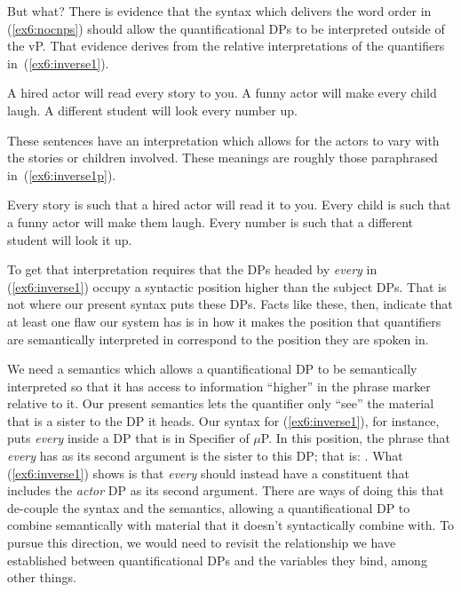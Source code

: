 But what? There is evidence that the syntax which delivers the word order in (\ref{ex6:nocnps}) should allow the quantificational DPs to be interpreted outside of the vP. That evidence derives from the relative interpretations of the quantifiers in~(\ref{ex6:inverse1}).
\begin{exe}
\raggedright
	\ex \label{ex6:inverse1}
	\begin{xlist}
		\ex A hired actor will read every story to you.
		\ex A funny actor will make every child laugh.
		\ex A different student will look every number up.
	\end{xlist}
\end{exe}
These sentences have an interpretation which allows for the actors to vary with the stories or children involved. These meanings are roughly those paraphrased in~(\ref{ex6:inverse1p}).
\begin{exe}
\raggedright
	\ex \label{ex6:inverse1p}
	\begin{xlist}
		\ex Every story is such that a hired actor will read it to you.
		\ex Every child is such that a funny actor will make them laugh.
		\ex Every number is such that a different student will look it up.
	\end{xlist}
\end{exe}
To get that interpretation requires that the DPs headed by \emph{every} in (\ref{ex6:inverse1}) occupy a syntactic position higher than the subject DPs. That is not where our present syntax puts these DPs. Facts like these, then, indicate that at least one flaw our system has is in how it makes the position that quantifiers are semantically interpreted in correspond to the position they are spoken in. 

We need a semantics which allows a quantificational DP to be semantically interpreted so that it has access to information ``higher'' in the phrase marker relative to it. Our present semantics lets the quantifier only ``see'' the material that is a sister to the DP it heads. Our syntax for (\ref{ex6:inverse1}), for instance, puts \emph{every} inside a DP that is in Specifier of $\mu$P. In this position, the phrase that \emph{every} has as its second argument is the sister to this DP; that is: \ibar{$\mu$}. What (\ref{ex6:inverse1}) shows is that \emph{every} should instead have a constituent that includes the \emph{actor} DP as its second argument. There are ways of doing this that de-couple the syntax and the semantics, allowing a quantificational DP to combine semantically with material that it doesn't syntactically combine with.%
%
%
%
To pursue this direction, we would need to revisit the relationship we have established between quantificational DPs and the variables they bind, among other things.


